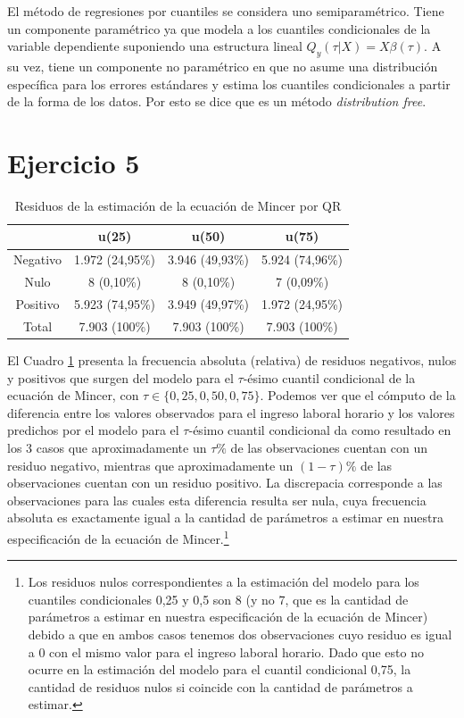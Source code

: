 \documentclass[11pt]{article}
\begin{document}
El método de regresiones por cuantiles se considera uno semiparamétrico. Tiene un componente paramétrico ya que modela a los cuantiles condicionales de la variable dependiente suponiendo una estructura lineal $Q_y(\tau | X ) = X \beta(\tau)$. A su vez, tiene un componente no paramétrico en que no asume una distribución específica para los errores estándares y estima los cuantiles condicionales a partir de la forma de los datos. Por esto se dice que es un método \textit{distribution free}.

\section*{Ejercicio 5}

\begin{table}[H]
    \centering
     \caption{Residuos de la estimación de la ecuación de Mincer por QR}
    \begin{tabular}{|c|c|c|c|}
    \hline
         & \textbf{u(25)} & \textbf{u(50)} & \textbf{u(75)}\\ \hline
    Negativo & 1.972 (24,95\%) & 3.946 (49,93\%) & 5.924 (74,96\%) \\
    Nulo     & 8 (0,10\%) & 8 (0,10\%) & 7 (0,09\%) \\
    Positivo & 5.923 (74,95\%) & 3.949 (49,97\%) & 1.972 (24,95\%) \\ \hline
    Total    & 7.903 (100\%) & 7.903 (100\%) & 7.903 (100\%) \\ \hline
    \end{tabular}
    \label{tab:residuos_QR}
\end{table}

El Cuadro \ref{tab:residuos_QR} presenta la frecuencia absoluta (relativa) de residuos negativos, nulos y positivos que surgen del modelo para el $\tau$-ésimo cuantil condicional de la ecuación de Mincer, con $\tau\in\{0,25,0,50,0,75\}$. Podemos ver que el cómputo de la diferencia entre los valores observados para el ingreso laboral horario y los valores predichos por el modelo para el $\tau$-ésimo cuantil condicional da como resultado en los 3 casos que aproximadamente un $\tau\%$ de las observaciones cuentan con un residuo negativo, mientras que aproximadamente un $(1-\tau)\%$ de las observaciones cuentan con un residuo positivo. La discrepacia corresponde a las observaciones para las cuales esta diferencia resulta ser nula, cuya frecuencia absoluta es exactamente igual a la cantidad de parámetros a estimar en nuestra especificación de la ecuación de Mincer.\footnote{Los residuos nulos correspondientes a la estimación del modelo para los cuantiles condicionales 0,25 y 0,5 son 8 (y no 7, que es la cantidad de parámetros a estimar en nuestra especificación de la ecuación de Mincer) debido a que en ambos casos tenemos dos observaciones cuyo residuo es igual a 0 con el mismo valor para el ingreso laboral horario. Dado que esto no ocurre en la estimación del modelo para el cuantil condicional 0,75, la cantidad de residuos nulos si coincide con la cantidad de parámetros a estimar.}
\end{document}
